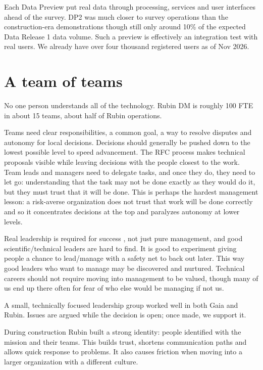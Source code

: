 Each Data Preview put real data through processing, services and user interfaces ahead of the survey.
DP2 \citep{RTN-115} was much closer to survey operations than the construction-era demonstrations though still only around 10\% of the expected Data Release 1 data volume.
Such a preview is effectively an integration test with real users.
We already have over four thousand registered users as of Nov 2026.

\section{A team of teams}
\label{sec:teams}

No one person understands all of the technology.
Rubin DM is roughly 100 FTE in about 15 teams, about half of Rubin operations.

Teams need clear responsibilities, a common goal, a way to resolve disputes and autonomy for local decisions.
Decisions should generally be pushed down to the lowest possible level to speed advancement.
The RFC process makes technical proposals visible while leaving decisions with the people closest to the work.
Team leads and managers need to delegate tasks, and once they do, they need to let go: understanding that the task may
not be done exactly as they would do it, but they must trust that it will be done.
This is perhaps the hardest management lesson: a risk-averse organization does not trust that work will be done correctly and so it concentrates decisions at the top and paralyzes autonomy at lower levels.

Real leadership is required for success \citep{bossfactor}, not just pure management, and good scientific/technical leaders are hard to find.
It is good to experiment giving people a chance to lead/manage with a safety net to back out later.
This way good leaders who want to manage may be discovered and nurtured.
Technical careers should not require moving into management to be valued, though many of us end up there often for fear of who else would be managing if not us.

A small, technically focused leadership group worked well in both Gaia and Rubin.
Issues are argued while the decision is open; once made, we support it.

During construction Rubin built a strong identity: people identified with the mission and their teams.
This builds trust, shortens communication paths and allows quick response to problems.
It also causes friction when moving into a larger organization with a different culture.

